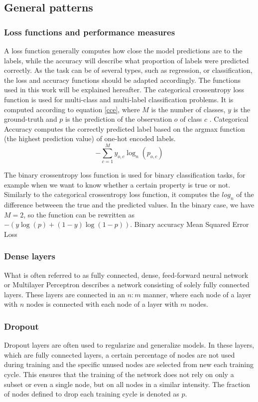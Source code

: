 \subsection{General patterns}
\subsubsection{Loss functions and performance measures}
 A loss function generally computes how close the model predictions are to the labels, while the accuracy will describe what proportion of labels were predicted correctly. As the task can be of several types, such as regression, or classification, the loss and accuracy functions should be adapted accordingly. The functions used in this work will be explained hereafter.
The categorical crossentropy loss function is used for multi-class and multi-label classification problems. It is computed according to equation \ref{cce}, where $M$ is the number of classes, $y$ is the ground-truth and $p$ is the prediction of the observation $o$ of class $c$ \cite{noauthor_classical_nodate}. 
Categorical Accuracy computes the correctly predicted label based on the argmax function (the highest prediction value) of one-hot encoded labels.
\begin{equation}
\label{cce}
-\sum_{c=1}^My_{o,c}\log_{n}(p_{o,c})
\end{equation}

The binary crossentropy loss function is used for binary classification tasks, for example when we want to know whether a certain property is true or not. Similarly to the categorical crossentropy loss function, it computes the $log_{n}$ of the difference betweeen the true and the predicted values. In the binary case, we have $M=2$, so the function can be rewritten as $-{(y\log(p) + (1 - y)\log(1 - p))}$.
Binary accuracy
Mean Squared Error Loss
 
 
\subsubsection{Dense layers}
What is often referred to as fully connected, dense, feed-forward neural network or Multilayer Perceptron describes a network consisting of solely fully connected layers. These layers are connected in an $n:m$ manner, where each node of a layer with $n$ nodes is connected with each node of a layer with $m$ nodes. 

\subsubsection{Dropout}
Dropout layers are often used to regularize and generalize models. In these layers, which are fully connected layers, a certain percentage of nodes are not used during training and the specific unused nodes are selected from new each training cycle. This ensures that the training of the network does not rely on only a subset or even a single node, but on all nodes in a similar intensity. The fraction of nodes defined to drop each training cycle is denoted as $p$.

